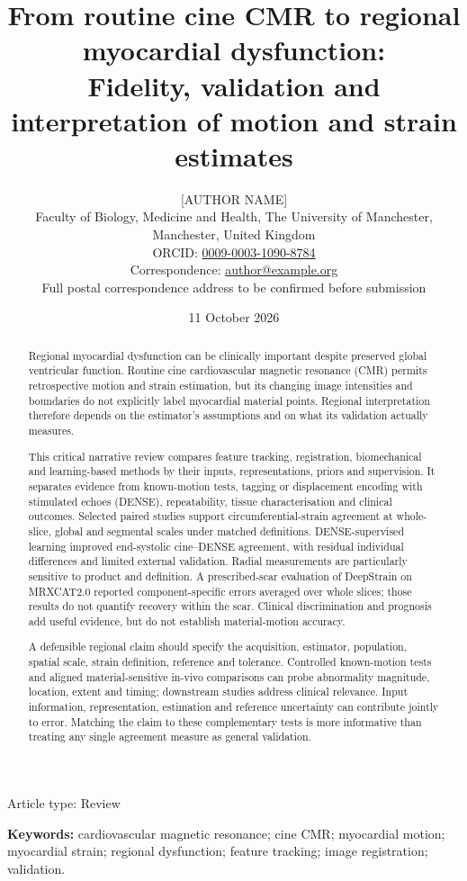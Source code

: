 \documentclass[11pt,a4paper]{article}
\title{\textbf{From routine cine CMR to regional myocardial dysfunction:}\\
\large Fidelity, validation and interpretation of motion and strain estimates}
\author{[AUTHOR NAME]\\[0.25em]
\small Faculty of Biology, Medicine and Health, The University of Manchester, Manchester, United Kingdom\\
\small ORCID: \href{https://orcid.org/0009-0003-1090-8784}{0009-0003-1090-8784}\\
\small Correspondence: \href{mailto:author@example.org}{author@example.org}\\
\small Full postal correspondence address to be confirmed before submission}
\date{11 October 2026}
\begin{document}
\linenumbers
\maketitle
\begin{center}
\small Article type: Review
\end{center}

\begin{abstract}
Regional myocardial dysfunction can be clinically important despite preserved global ventricular function. Routine cine cardiovascular magnetic resonance (CMR) permits retrospective motion and strain estimation, but its changing image intensities and boundaries do not explicitly label myocardial material points. Regional interpretation therefore depends on the estimator's assumptions and on what its validation actually measures.

This critical narrative review compares feature tracking, registration, biomechanical and learning-based methods by their inputs, representations, priors and supervision. It separates evidence from known-motion tests, tagging or displacement encoding with stimulated echoes (DENSE), repeatability, tissue characterisation and clinical outcomes. Selected paired studies support circumferential-strain agreement at whole-slice, global and segmental scales under matched definitions. DENSE-supervised learning improved end-systolic cine--DENSE agreement, with residual individual differences and limited external validation. Radial measurements are particularly sensitive to product and definition. A prescribed-scar evaluation of DeepStrain on MRXCAT2.0 reported component-specific errors averaged over whole slices; those results do not quantify recovery within the scar. Clinical discrimination and prognosis add useful evidence, but do not establish material-motion accuracy.

A defensible regional claim should specify the acquisition, estimator, population, spatial scale, strain definition, reference and tolerance. Controlled known-motion tests and aligned material-sensitive in-vivo comparisons can probe abnormality magnitude, location, extent and timing; downstream studies address clinical relevance. Input information, representation, estimation and reference uncertainty can contribute jointly to error. Matching the claim to these complementary tests is more informative than treating any single agreement measure as general validation.
\end{abstract}

\noindent\textbf{Keywords:} cardiovascular magnetic resonance; cine CMR; myocardial motion; myocardial strain; regional dysfunction; feature tracking; image registration; validation.
\end{document}
